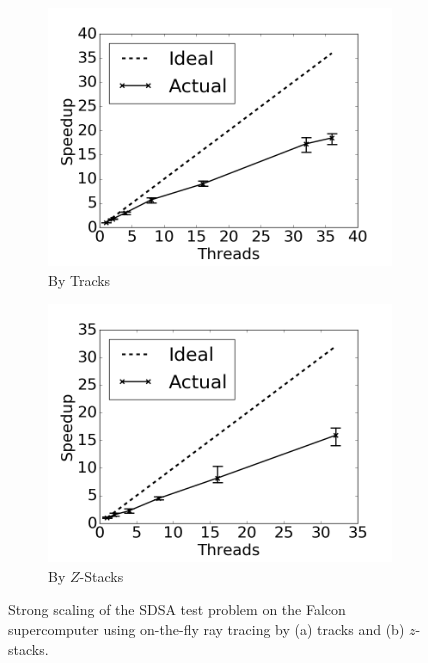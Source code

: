 \begin{figure}[h!]
	\centering
	\begin{subfigure}{0.45\textwidth}
		\centering
		\includegraphics[width=\linewidth]{figures/fs-parallel-scaling-tracks.png}
		\caption{By Tracks}
		\label{fig:rt-parallel-fs-tracks}
	\end{subfigure}
	\begin{subfigure}{0.45\textwidth}
		\centering
		\includegraphics[width=\linewidth]{figures/fs-parallel-scaling-stacks.png}
		\caption{By $Z$-Stacks}
		\label{fig:rt-parallel-fs-stacks}
	\end{subfigure}
	\caption[]{Strong scaling of the SDSA test problem on the Falcon supercomputer using on-the-fly ray tracing by (a) tracks and (b) $z$-stacks.}
	\label{fig:rt-parallel-fs}
\end{figure}


